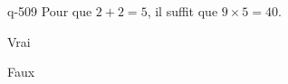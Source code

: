 \begin{truefalse}{q-509}
Pour que $2+2=5$, il suffit que $9\times 5 = 40$.
\item* Vrai
\item Faux
\end{truefalse}

